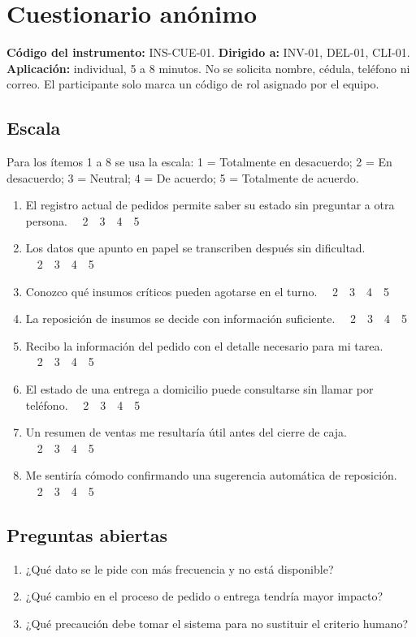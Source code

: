 \providecommand{\iquest}[1]{¿#1}
\section{Cuestionario an\'onimo}

\textbf{C\'odigo del instrumento:} INS-CUE-01. \textbf{Dirigido a:} INV-01, DEL-01, CLI-01.
\textbf{Aplicaci\'on:} individual, 5 a 8 minutos. No se solicita nombre, c\'edula, tel\'efono ni correo. El participante solo marca un c\'odigo de rol asignado por el equipo.

\subsection*{Escala}
Para los \'itemos 1 a 8 se usa la escala: 1 = Totalmente en desacuerdo; 2 = En desacuerdo; 3 = Neutral; 4 = De acuerdo; 5 = Totalmente de acuerdo.

\begin{enumerate}[leftmargin=18pt,itemsep=0pt]
    \item El registro actual de pedidos permite saber su estado sin preguntar a otra persona. ~~2~~3~~4~~5
    \item Los datos que apunto en papel se transcriben despu\'es sin dificultad. ~~2~~3~~4~~5
    \item Conozco qu\'e insumos cr\'iticos pueden agotarse en el turno. ~~2~~3~~4~~5
    \item La reposici\'on de insumos se decide con informaci\'on suficiente. ~~2~~3~~4~~5
    \item Recibo la informaci\'on del pedido con el detalle necesario para mi tarea. ~~2~~3~~4~~5
    \item El estado de una entrega a domicilio puede consultarse sin llamar por tel\'efono. ~~2~~3~~4~~5
    \item Un resumen de ventas me resultar\'ia \'util antes del cierre de caja. ~~2~~3~~4~~5
    \item Me sentir\'ia c\'omodo confirmando una sugerencia autom\'atica de reposici\'on. ~~2~~3~~4~~5
\end{enumerate}

\subsection*{Preguntas abiertas}
\begin{enumerate}[leftmargin=18pt,itemsep=0pt,start=9]
    \item \iquest{Qu\'e dato se le pide con m\'as frecuencia y no est\'a disponible?}
    \item \iquest{Qu\'e cambio en el proceso de pedido o entrega tendr\'ia mayor impacto?}
    \item \iquest{Qu\'e precauci\'on debe tomar el sistema para no sustituir el criterio humano?}
\end{enumerate}

